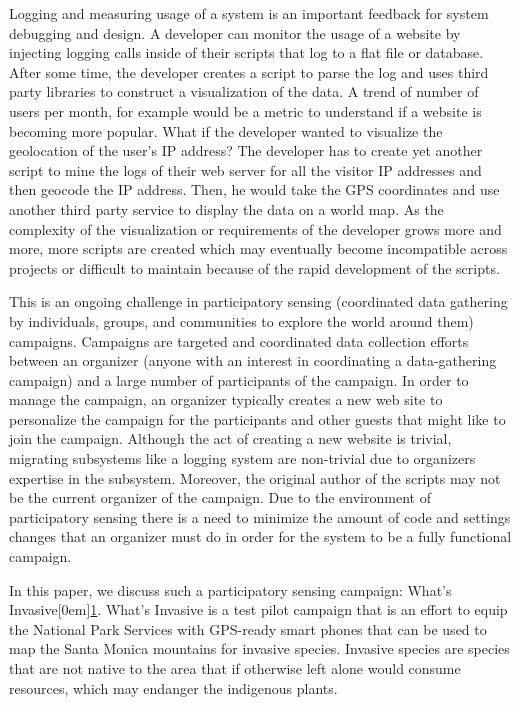 \documentclass[10pt,a4paper,english]{article}
\begin{document}
Logging and measuring usage of a system is an important feedback for system debugging and design. A developer can monitor the usage of a website by injecting logging calls inside of their scripts that log to a flat file or database. After some time, the developer creates a script to parse the log and uses third party libraries to construct a visualization of the data. A trend of number of users per month, for example would be a metric to understand if a website is becoming more popular. What if the developer wanted to visualize the geolocation of the user's IP address? The developer has to create yet another script to mine the logs of their web server for all the visitor IP addresses and then geocode the IP address. Then, he would take the GPS coordinates and use another third party service to display the data on a world map. As the complexity of the visualization or requirements of the developer grows more and more, more scripts are created which may eventually become incompatible across projects or difficult to maintain because of the rapid development of the scripts.

This is an ongoing challenge in participatory sensing (coordinated data gathering by individuals, groups, and communities to explore the world around them) campaigns. Campaigns are targeted and coordinated data collection efforts between an organizer (anyone with an interest in coordinating a data-gathering campaign) and a large number of participants of the campaign. In order to manage the campaign, an organizer typically creates a new web site to personalize the campaign for the participants and other guests that might like to join the campaign. Although the act of creating a new website is trivial, migrating subsystems like a logging system are non-trivial due to organizers expertise in the subsystem. Moreover, the original author of the scripts may not be the current organizer of the campaign. Due to the environment of participatory sensing there is a need to minimize the amount of code and settings changes that an organizer must do in order for the system to be a fully functional campaign.

In this paper, we discuss such a participatory sensing campaign: What's Invasive\raisebox{.5em}[0em]{\scriptsize\hyperlink{id2}{1}}. What's Invasive is a test pilot campaign that is an effort to equip the National Park Services with GPS-ready smart phones that can be used to map the Santa Monica mountains for invasive species. Invasive species are species that are not native to the area that if otherwise left alone would consume resources, which may endanger the indigenous plants.
\end{document}
